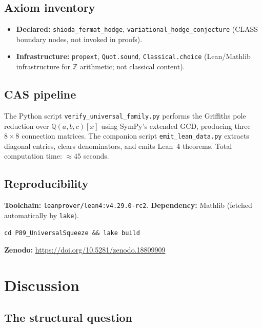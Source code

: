 \documentclass[11pt,a4paper]{article}
\theoremstyle{definition}
\theoremstyle{remark}
\newcommand{\ZZ}{\mathbb{Z}}
\newcommand{\QQ}{\mathbb{Q}}
\begin{document}
\subsection{Axiom inventory}

\begin{itemize}[nosep]
  \item \textbf{Declared:} \texttt{shioda\_fermat\_hodge},
        \texttt{variational\_hodge\_conjecture} (CLASS boundary nodes,
        not invoked in proofs).
  \item \textbf{Infrastructure:} \texttt{propext}, \texttt{Quot.sound},
        \texttt{Classical.choice} (Lean/Mathlib infrastructure for $\ZZ$
        arithmetic; not classical content).
\end{itemize}

\subsection{CAS pipeline}

The Python script \texttt{verify\_universal\_family.py} performs the
Griffiths pole reduction over $\QQ(a,b,c)[x]$ using SymPy's extended
GCD, producing three $8 \times 8$ connection matrices.
The companion script \texttt{emit\_lean\_data.py} extracts diagonal entries,
clears denominators, and emits Lean~4 theorems.
Total computation time: $\approx 45$ seconds.

\subsection{Reproducibility}

\textbf{Toolchain:} \texttt{leanprover/lean4:v4.29.0-rc2}.
\textbf{Dependency:} Mathlib (fetched automatically by \texttt{lake}).

\begin{verbatim}
cd P89_UniversalSqueeze && lake build
\end{verbatim}

\noindent
\textbf{Zenodo:} \url{https://doi.org/10.5281/zenodo.18809909}

\section{Discussion}

\subsection{The structural question}
\end{document}
